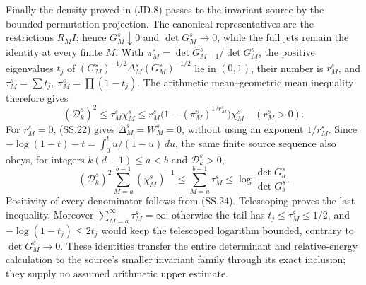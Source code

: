 Finally the density proved in (JD.8) passes to the invariant source
by the bounded permutation projection.  The canonical representatives
are the restrictions \(R_MI\); hence \(G_M^s\downarrow0\)
and \(\det G_M^s\to0\), while the full jets remain the identity
at every finite \(M\).  With
\(\pi_M^s=\det G_{M+1}^s/\det G_M^s\), the positive
eigenvalues \(t_j\) of
\((G_M^s)^{-1/2}\Delta_M^s(G_M^s)^{-1/2}\) lie in
\((0,1)\), their number is \(r_M^s\), and
\(\tau_M^s=\sum t_j\), \(\pi_M^s=\prod(1-t_j)\).
The arithmetic mean--geometric mean inequality therefore gives
\[
 (\mathcal D_k^s)^2\le\tau_M^s\chi_M^s
 \le r_M^s\bigl(1-(\pi_M^s)^{1/r_M^s}\bigr)\chi_M^s
                  \quad(r_M^s>0).                    \tag{SS.27}
\]
For \(r_M^s=0\), (SS.22) gives \(\Delta_M^s=W_M^s=0\),
without using an exponent \(1/r_M^s\).  Since
\(-\log(1-t)-t=\int_0^t u/(1-u)\,du\), the same finite
source sequence also obeys, for integers \(k(d-1)\le a<b\) and
\(\mathcal D_k^s>0\),
\[
 (\mathcal D_k^s)^2\sum_{M=a}^{b-1}(\chi_M^s)^{-1}
 \le\sum_{M=a}^{b-1}\tau_M^s
 \le\log\frac{\det G_a^s}{\det G_b^s}.                 \tag{SS.28}
\]
Positivity of every denominator follows from (SS.24).
Telescoping proves the last inequality.  Moreover
\(\sum_{M=a}^\infty\tau_M^s=\infty\): otherwise the tail
has \(t_j\le\tau_M^s\le1/2\), and
\(-\log(1-t_j)\le2t_j\) would keep the telescoped logarithm
bounded, contrary to \(\det G_M^s\to0\).  These identities
transfer the entire determinant and relative-energy calculation to
the source's smaller invariant family through its exact inclusion;
they supply no assumed arithmetic upper estimate.
